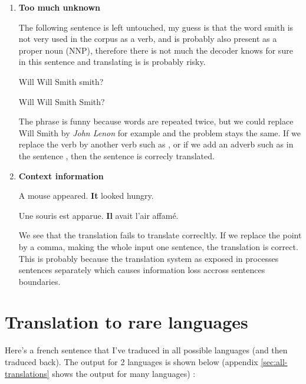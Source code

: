 \documentclass[a4paper, 11pt]{article}
\newcommand{\itemi}[1]{\item{\textbf{#1}}}
\begin{document}
\begin{enumerate}
  \itemi{Too much unknown}

  The following sentence is left untouched, my guess is that the word
  smith is not very used in the corpus as a verb, and is probably also
  present as a proper noun (NNP), therefore there is not much the
  decoder knows for sure in this sentence and translating is is
  probably risky.

  \begin{inputcbox}
    Will Will Smith smith?
  \end{inputcbox}
  \begin{outputcbox}
    Will Will Smith Smith?
  \end{outputcbox}

  The phrase is funny because words are repeated twice, but we could
  replace Will Smith by \emph{John Lenon} for example and the problem
  stays the same. If we replace the verb  by another verb
  such as , or if we add an adverb such as in the sentence
  , then the sentence is
  correcly translated.

  \itemi{Context information}

  \begin{inputcbox}
    A mouse appeared. \textbf{It} looked hungry.
  \end{inputcbox}
  \begin{outputcbox}
    Une souris est apparue. \textbf{Il} avait l'air affamé.
  \end{outputcbox}

  We see that the translation fails to translate 
  correcltly. If we replace the point by a comma, making the whole
  input one sentence, the translation is correct. This is probably
  because the translation system as exposed in \cite{wu2016google}
  processes sentences separately which causes information loss accross
  sentences boundaries.

\end{enumerate}

\section{Translation to rare languages}
\label{sec:rare-languages}

Here's a french sentence that I've traduced in all possible languages
(and then traduced back). The output for 2  languages is
shown below (appendix \ref{sec:all-translations} shows the output for
many languages) :
\end{document}
